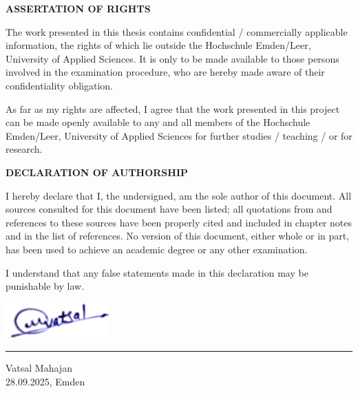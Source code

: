 
\clearpage
\thispagestyle{empty}

\noindent\textbf{ASSERTATION OF RIGHTS}

\vspace{0.8\baselineskip}

\noindent
The work presented in this thesis contains confidential / commercially applicable information, the rights of which lie outside the Hochschule Emden/Leer, University of Applied Sciences. It is only to be made available to those persons involved in the examination procedure, who are hereby made aware of their confidentiality obligation.

\vspace{0.8\baselineskip}

As far as my rights are affected, I agree that the work presented in this project can be made openly available to any and all members of the Hochschule Emden/Leer, University of Applied Sciences for further studies / teaching / or for research.

\vspace{1.6\baselineskip}

\noindent\textbf{DECLARATION OF AUTHORSHIP}

\vspace{0.8\baselineskip}

\noindent
I hereby declare that I, the undersigned, am the sole author of this document. All sources consulted for this document have been listed; all quotations from and references to these sources have been properly cited and included in chapter notes and in the list of references. No version of this document, either whole or in part, has been used to achieve an academic degree or any other examination.

\vspace{0.8\baselineskip}

I understand that any false statements made in this declaration may be punishable by law.

\vspace{3\baselineskip}

\noindent\begin{minipage}{4cm}
	\centering
	\includegraphics[width=4cm]{signature.jpeg}\\[-1.5\baselineskip] %
	\rule{4cm}{0.5pt}
\end{minipage}

\vspace{0.8\baselineskip}

Vatsal Mahajan\\
28.09.2025, Emden

\clearpage
